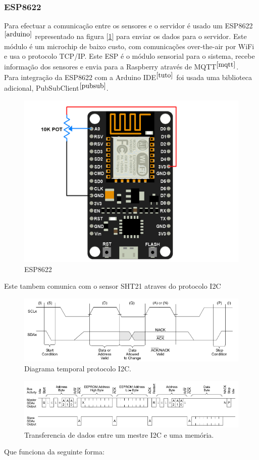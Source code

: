 \documentclass[12pt]{article}
\begin{document}

\subsubsection{ESP8622}

\par Para efectuar a comunicação entre os sensores e o servidor é usado um ESP8622$^{\cite{arduino}}$ representado na figura [\ref{fig:8622}] para enviar os dados para o servidor. Este módulo é um microchip de baixo custo, com comunicações over-the-air por WiFi e usa o protocolo TCP/IP. Este ESP é o módulo sensorial para o sistema, recebe informação dos sensores e envia para a Raspberry através de MQTT$^{\cite{mqtt}}$.\\
Para integração da ESP8622 com a Arduino IDE$^{\cite{tuto}}$ foi usada uma biblioteca adicional, PubSubClient$^{\cite{pubsub}}$.

\begin{figure}[H]
        \centering
        \includegraphics[width=0.4\linewidth]{imgs/NodeMCU_Potentiometer_Interface.png}
        \caption{ESP8622}
        \label{fig:8622}
\end{figure}
Este tambem comunica com o sensor SHT21 atraves do protocolo I2C
\begin{figure}[H]
        \centering
        \includegraphics[width=0.7\linewidth]{imgs/I2C_time_diagram.png}
        \caption{Diagrama temporal protocolo I2C.}
        \label{fig:i2c_time}
\end{figure}
\begin{figure}[H]
        \centering
        \includegraphics[width=0.7\linewidth]{imgs/I2C_data_transfer.png}
        \caption{Transferencia de dados entre um mestre I2C e uma memória.}
        \label{fig:i2c_transfer}
\end{figure}
Que funciona da seguinte forma:
\end{document}
